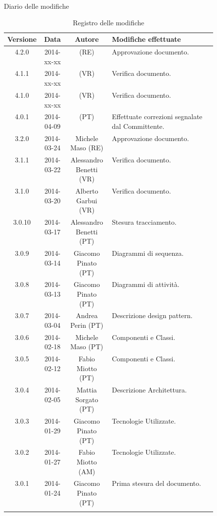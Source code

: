 
\newpage
Diario delle modifiche
\begin{center}
\begin{longtable}{|c|c|c|p{0.5\linewidth}|}
\toprule
\textbf{Versione} & \textbf{Data} & \textbf{Autore} & \textbf{Modifiche effettuate}\\

\midrule
4.2.0 & 2014-xx-xx &   (RE) & Approvazione documento.\\
\midrule
4.1.1 & 2014-xx-xx &   (VR) & Verifica documento.\\
\midrule
4.1.0 & 2014-xx-xx &   (VR) & Verifica documento.\\



\midrule
4.0.1 & 2014-04-09 &   (PT) & Effettuate correzioni segnalate dal Committente.\\



\midrule
3.2.0 & 2014-03-24 & Michele Maso (RE) & Approvazione documento.\\
\midrule
3.1.1 & 2014-03-22 & Alessandro Benetti (VR) & Verifica documento.\\
\midrule
3.1.0 & 2014-03-20 & Alberto Garbui (VR) & Verifica documento.\\
\midrule
3.0.10 & 2014-03-17 & Alessandro Benetti (PT) & Stesura tracciamento.\\
\midrule
3.0.9 & 2014-03-14 & Giacomo Pinato (PT) & Diagrammi di sequenza.\\
\midrule
3.0.8 & 2014-03-13 & Giacomo Pinato (PT) & Diagrammi di attività.\\
\midrule
3.0.7 & 2014-03-04 & Andrea Perin (PT) & Descrizione design pattern.\\
\midrule
3.0.6 & 2014-02-18 & Michele Maso (PT) & Componenti e Classi.\\
\midrule
3.0.5 & 2014-02-12 & Fabio Miotto (PT) & Componenti e Classi.\\
\midrule
3.0.4 & 2014-02-05 & Mattia Sorgato (PT) & Descrizione Architettura.\\
\midrule
3.0.3 & 2014-01-29 & Giacomo Pinato (PT) & Tecnologie Utilizzate.\\
\midrule
3.0.2 & 2014-01-27 & Fabio Miotto (AM) & Tecnologie Utilizzate.\\
\midrule
3.0.1 & 2014-01-24 & Giacomo Pinato (PT) & Prima stesura del documento.\\

\bottomrule
\caption{Registro delle modifiche}
\label{tab:changelog}

\end{longtable}
\end{center}

